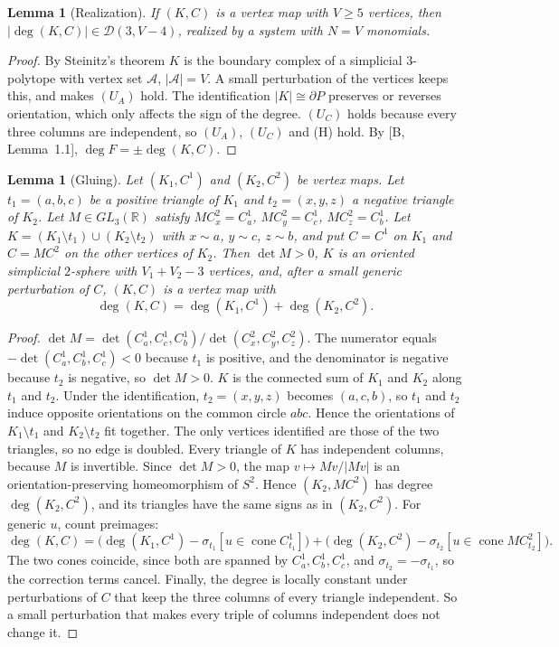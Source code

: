 \documentclass[11pt]{amsart}
\newtheorem{lemma}[theorem]{Lemma}
\theoremstyle{remark}
\newcommand{\A}{\mathcal A}
\begin{document}
\begin{lemma}[Realization]\label{lem:real}
If $(K,C)$ is a vertex map with $V\ge5$ vertices, then $|\deg(K,C)|\in\mathcal D(3,V-4)$, realized by a system with $N=V$ monomials.
\end{lemma}
\begin{proof}
By Steinitz's theorem $K$ is the boundary complex of a simplicial $3$-polytope with vertex set $\A$, $|\A|=V$. A small perturbation of the vertices keeps this, and makes $(U_A)$ hold.
The identification $|K|\cong\partial P$ preserves or reverses orientation, which only affects the sign of the degree.
$(U_C)$ holds because every three columns are independent, so $(U_A)$, $(U_C)$ and (H) hold. By [B, Lemma~1.1], $\deg F=\pm\deg(K,C)$.
\end{proof}

\begin{lemma}[Gluing]\label{lem:glue}
Let $(K_1,C^1)$ and $(K_2,C^2)$ be vertex maps. Let $t_1=(a,b,c)$ be a positive triangle of $K_1$ and $t_2=(x,y,z)$ a negative triangle of $K_2$.
Let $M\in GL_3(\mathbb R)$ satisfy $MC^2_x=C^1_a$, $MC^2_y=C^1_c$, $MC^2_z=C^1_b$.
Let $K=(K_1\setminus t_1)\cup(K_2\setminus t_2)$ with $x\sim a$, $y\sim c$, $z\sim b$, and put $C=C^1$ on $K_1$ and $C=MC^2$ on the other vertices of $K_2$.
Then $\det M>0$, $K$ is an oriented simplicial $2$-sphere with $V_1+V_2-3$ vertices, and, after a small generic perturbation of $C$, $(K,C)$ is a vertex map with
\[
\deg(K,C)=\deg(K_1,C^1)+\deg(K_2,C^2).
\]
\end{lemma}
\begin{proof}
$\det M=\det(C^1_a,C^1_c,C^1_b)/\det(C^2_x,C^2_y,C^2_z)$. The numerator equals $-\det(C^1_a,C^1_b,C^1_c)<0$ because $t_1$ is positive, and the denominator is negative because $t_2$ is negative, so $\det M>0$.
$K$ is the connected sum of $K_1$ and $K_2$ along $t_1$ and $t_2$. Under the identification, $t_2=(x,y,z)$ becomes $(a,c,b)$, so $t_1$ and $t_2$ induce opposite orientations on the common circle $abc$. Hence the orientations of $K_1\setminus t_1$ and $K_2\setminus t_2$ fit together. The only vertices identified are those of the two triangles, so no edge is doubled. Every triangle of $K$ has independent columns, because $M$ is invertible.
Since $\det M>0$, the map $v\mapsto Mv/|Mv|$ is an orientation-preserving homeomorphism of $S^2$. Hence $(K_2,MC^2)$ has degree $\deg(K_2,C^2)$, and its triangles have the same signs as in $(K_2,C^2)$.
For generic $u$, count preimages:
\[
\deg(K,C)=\bigl(\deg(K_1,C^1)-\sigma_{t_1}[u\in\operatorname{cone}C^1_{t_1}]\bigr)+\bigl(\deg(K_2,C^2)-\sigma_{t_2}[u\in\operatorname{cone}MC^2_{t_2}]\bigr).
\]
The two cones coincide, since both are spanned by $C^1_a,C^1_b,C^1_c$, and $\sigma_{t_2}=-\sigma_{t_1}$, so the correction terms cancel.
Finally, the degree is locally constant under perturbations of $C$ that keep the three columns of every triangle independent. So a small perturbation that makes every triple of columns independent does not change it.
\end{proof}
\end{document}
